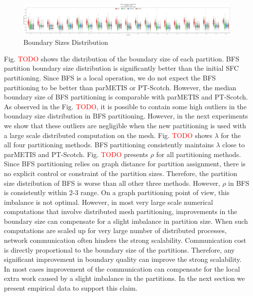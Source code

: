 \documentclass[conference]{IEEEtran}
\begin{document}
\begin{figure}[htbp]
    \centering
    \includegraphics[width=\textwidth]{figures/boundary-sizes.pdf}
    \caption{Boundary Sizes Distribution}
    \label{fig:bdry-sizes}
\end{figure}



Fig. \textcolor{red}{TODO} shows the distribution of the boundary size of each partition. BFS partition boundary size distribution is significantly better than the initial SFC partitioning. Since BFS is a local operation, we do not expect the BFS partitioning to be better than parMETIS or PT-Scotch. However, the median boundary size of BFS partitioning is comparable with parMETIS and PT-Scotch. As observed in the Fig. \textcolor{red}{TODO}, it is possible to contain some high outliers in the boundary size distribution in BFS partitioning. However, in the next experiments we show that these outliers are negligible when the new partitioning is used with a large scale distributed computation on the mesh. Fig. \textcolor{red}{TODO} shows $\lambda$ for the all four partitioning methods. BFS partitioning consistently maintains $\lambda$ close to parMETIS and PT-Scotch. Fig. \textcolor{red}{TODO} presents $\rho$ for all partitioning methods. Since BFS partitioning relies on graph distance for partition assignment, there is no explicit control or constraint of the partition sizes. Therefore, the partition size distribution of BFS is worse than all other three methods. However, $\rho$ in BFS is consistently within 2-3 range. On a graph partitioning point of view, this imbalance is not optimal. However, in most very large scale numerical computations that involve distributed mesh partitioning, improvements in the boundary size can compensate for a slight imbalance in partition size. When such computations are scaled up for very large number of distributed processes, network communication often hinders the strong scalability. Communication cost is directly proportional to the boundary size of the partitions. Therefore, any significant improvement in boundary quality can improve the strong scalability. In most cases improvement of the communication can compensate for the local extra work caused by a slight imbalance in the partitions. In the next section we present empirical data to support this claim.
\end{document}
